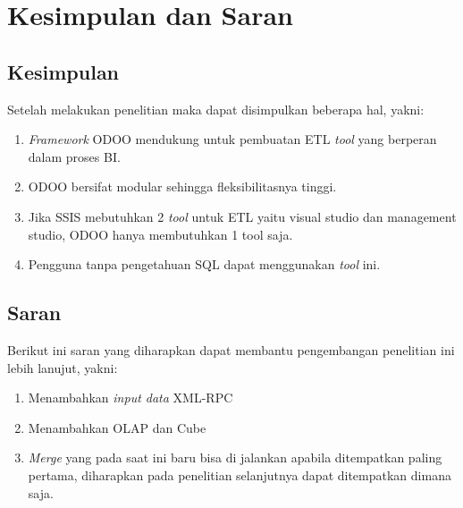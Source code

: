 \chapter{Kesimpulan dan Saran}
\label{chap:Summary}

\section{Kesimpulan}
Setelah melakukan penelitian maka dapat disimpulkan beberapa hal, yakni:
\begin{enumerate}
	\item \textit{Framework} ODOO mendukung untuk pembuatan ETL \textit{tool} yang berperan dalam proses BI.
	\item ODOO bersifat modular sehingga fleksibilitasnya tinggi.
	\item Jika SSIS mebutuhkan 2 \textit{tool} untuk ETL yaitu visual studio dan management studio, ODOO hanya membutuhkan 1 tool saja.
	\item Pengguna tanpa pengetahuan SQL dapat menggunakan \textit{tool} ini.
	
\end{enumerate}

\section{Saran}
Berikut ini saran yang diharapkan dapat membantu pengembangan penelitian ini lebih lanujut, yakni:
\begin{enumerate}
	\item Menambahkan \textit{input data} XML-RPC
	\item Menambahkan OLAP dan Cube
	\item \textit{Merge} yang pada saat ini baru bisa di jalankan apabila ditempatkan paling pertama, diharapkan pada penelitian selanjutnya dapat ditempatkan dimana saja.
\end{enumerate}